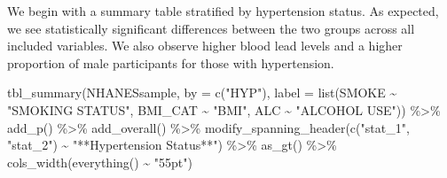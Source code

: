 \documentclass[
  letterpaper,
]{latex/krantz}
\makeatletter
\newenvironment{Shaded}{\begin{snugshade}}{\end{snugshade}}
\newcommand{\AttributeTok}[1]{\textcolor[rgb]{0.40,0.45,0.13}{#1}}
\newcommand{\FunctionTok}[1]{\textcolor[rgb]{0.28,0.35,0.67}{#1}}
\newcommand{\NormalTok}[1]{\textcolor[rgb]{0.00,0.23,0.31}{#1}}
\newcommand{\SpecialCharTok}[1]{\textcolor[rgb]{0.37,0.37,0.37}{#1}}
\newcommand{\StringTok}[1]{\textcolor[rgb]{0.13,0.47,0.30}{#1}}
\newenvironment{kframe}{%
\medskip{}
\setlength{\fboxsep}{.8em}
 \def\at@end@of@kframe{}%
 \ifinner\ifhmode%
  \def\at@end@of@kframe{\end{minipage}}%
  \begin{minipage}{\columnwidth}%
 \fi\fi%
 \def\FrameCommand##1{\hskip\@totalleftmargin \hskip-\fboxsep
 \colorbox{shadecolor}{##1}\hskip-\fboxsep
     \hskip-\linewidth \hskip-\@totalleftmargin \hskip\columnwidth}%
 \MakeFramed {\advance\hsize-\width
   \@totalleftmargin\z@ \linewidth\hsize
   \@setminipage}}%
 {\par\unskip\endMakeFramed%
 \at@end@of@kframe}
\renewenvironment{Shaded}{\begin{kframe}}{\end{kframe}}
\makeatother
\begin{document}
We begin with a summary table stratified by hypertension status. As
expected, we see statistically significant differences between the two
groups across all included variables. We also observe higher blood lead
levels and a higher proportion of male participants for those with
hypertension.

\begin{Shaded}
\begin{Highlighting}[]
\FunctionTok{tbl\_summary}\NormalTok{(NHANESsample, }\AttributeTok{by =} \FunctionTok{c}\NormalTok{(}\StringTok{"HYP"}\NormalTok{),}
            \AttributeTok{label =} \FunctionTok{list}\NormalTok{(SMOKE }\SpecialCharTok{\textasciitilde{}} \StringTok{"SMOKING STATUS"}\NormalTok{,}
\NormalTok{                         BMI\_CAT }\SpecialCharTok{\textasciitilde{}} \StringTok{"BMI"}\NormalTok{,}
\NormalTok{                         ALC }\SpecialCharTok{\textasciitilde{}} \StringTok{"ALCOHOL USE"}\NormalTok{)) }\SpecialCharTok{\%\textgreater{}\%}
  \FunctionTok{add\_p}\NormalTok{() }\SpecialCharTok{\%\textgreater{}\%}
  \FunctionTok{add\_overall}\NormalTok{() }\SpecialCharTok{\%\textgreater{}\%}
  \FunctionTok{modify\_spanning\_header}\NormalTok{(}\FunctionTok{c}\NormalTok{(}\StringTok{"stat\_1"}\NormalTok{, }\StringTok{"stat\_2"}\NormalTok{) }\SpecialCharTok{\textasciitilde{}} 
                           \StringTok{"**Hypertension Status**"}\NormalTok{) }\SpecialCharTok{\%\textgreater{}\%}
  \FunctionTok{as\_gt}\NormalTok{() }\SpecialCharTok{\%\textgreater{}\%}
  \FunctionTok{cols\_width}\NormalTok{(}\FunctionTok{everything}\NormalTok{() }\SpecialCharTok{\textasciitilde{}} \StringTok{"55pt"}\NormalTok{)}
\end{Highlighting}
\end{Shaded}
\end{document}
